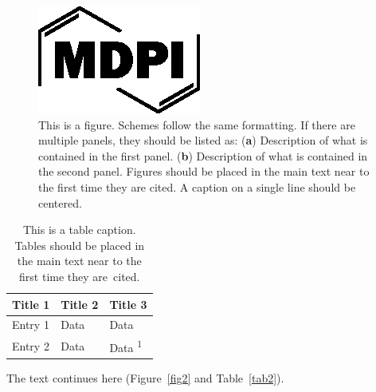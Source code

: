 \documentclass[entropy,article,submit,pdftex,moreauthors]{Definitions/mdpi}
\begin{document}
\begin{figure}[H]
\includegraphics[width=10.5 cm]{Definitions/logo-mdpi}
\caption{This is a figure. Schemes follow the same formatting. If there are multiple panels, they should be listed as: (\textbf{a}) Description of what is contained in the first panel. (\textbf{b}) Description of what is contained in the second panel. Figures should be placed in the main text near to the first time they are cited. A caption on a single line should be centered.\label{fig1}}
\end{figure}   
\unskip

\begin{table}[H] 
\caption{This is a table caption. Tables should be placed in the main text near to the first time they are~cited.\label{tab1}}
\begin{tabularx}{\textwidth}{CCC}
\toprule
\textbf{Title 1}	& \textbf{Title 2}	& \textbf{Title 3}\\
\midrule
Entry 1		& Data			& Data\\
Entry 2		& Data			& Data \textsuperscript{1}\\
\bottomrule
\end{tabularx}
\end{table}

The text continues here (Figure~\ref{fig2} and Table~\ref{tab2}).
\end{document}
